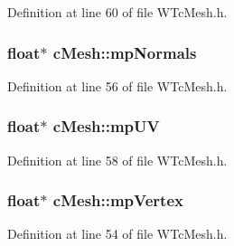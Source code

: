 Definition at line 60 of file WTcMesh.h.

\hypertarget{classc_mesh_a84d273677bbeb936a53b60853d036321}{
\subsubsection[{mpNormals}]{\setlength{\rightskip}{0pt plus 5cm}float$\ast$ {\bf cMesh::mpNormals}}}
\label{classc_mesh_a84d273677bbeb936a53b60853d036321}


Definition at line 56 of file WTcMesh.h.

\hypertarget{classc_mesh_a631948d3ab58799de048697800d354ce}{
\subsubsection[{mpUV}]{\setlength{\rightskip}{0pt plus 5cm}float$\ast$ {\bf cMesh::mpUV}}}
\label{classc_mesh_a631948d3ab58799de048697800d354ce}


Definition at line 58 of file WTcMesh.h.

\hypertarget{classc_mesh_a57db8cac8c3af0a47aec90d64cd8b582}{
\subsubsection[{mpVertex}]{\setlength{\rightskip}{0pt plus 5cm}float$\ast$ {\bf cMesh::mpVertex}}}
\label{classc_mesh_a57db8cac8c3af0a47aec90d64cd8b582}


Definition at line 54 of file WTcMesh.h.


